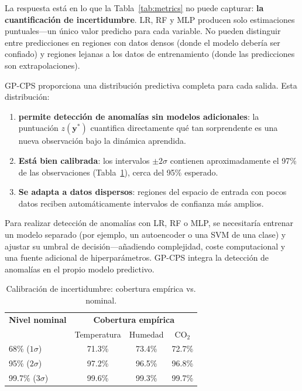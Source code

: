 \documentclass[conference]{IEEEtran}
\begin{document}
La respuesta está en lo que la Tabla~\ref{tab:metrics} no puede capturar: \textbf{la cuantificación de incertidumbre}. LR, RF y MLP producen solo estimaciones puntuales---un único valor predicho para cada variable. No pueden distinguir entre predicciones en regiones con datos densos (donde el modelo debería ser confiado) y regiones lejanas a los datos de entrenamiento (donde las predicciones son extrapolaciones).

GP-CPS proporciona una distribución predictiva completa para cada salida. Esta distribución:
\begin{enumerate}[nosep]
\item \textbf{ permite detección de anomalías sin modelos adicionales}: la puntuación $z(\mathbf{y}^*)$ cuantifica directamente qué tan sorprendente es una nueva observación bajo la dinámica aprendida.
\item \textbf{Está bien calibrada}: los intervalos $\pm 2\sigma$ contienen aproximadamente el 97\% de las observaciones (Tabla~\ref{tab:calibracion}), cerca del 95\% esperado.
\item \textbf{Se adapta a datos dispersos}: regiones del espacio de entrada con pocos datos reciben automáticamente intervalos de confianza más amplios.
\end{enumerate}

Para realizar detección de anomalías con LR, RF o MLP, se necesitaría entrenar un modelo separado (por ejemplo, un autoencoder o una SVM de una clase) y ajustar su umbral de decisión---añadiendo complejidad, coste computacional y una fuente adicional de hiperparámetros. GP-CPS integra la detección de anomalías en el propio modelo predictivo.

\begin{table}[t]
\centering
\caption{Calibración de incertidumbre: cobertura empírica vs. nominal.}
\label{tab:calibracion}
\small
\begin{tabular}{lccc}
\toprule
\textbf{Nivel nominal} & \multicolumn{3}{c}{\textbf{Cobertura empírica}} \\
 & Temperatura & Humedad & CO$_2$ \\
\midrule
68\% ($1\sigma$) & 71.3\% & 73.4\% & 72.7\% \\
95\% ($2\sigma$) & 97.2\% & 96.5\% & 96.8\% \\
99.7\% ($3\sigma$) & 99.6\% & 99.3\% & 99.7\% \\
\bottomrule
\end{tabular}
\end{table}
\end{document}
